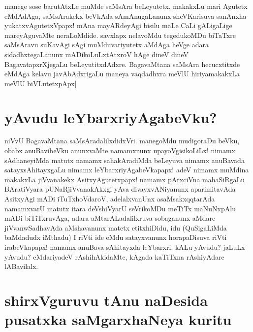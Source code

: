 manege sose barutAtxLe muMde saMsAra beLeyutetx, makakxLu mari Agutetx eMdAdAga, saMsArakekx beVkAda sAmAnugaLanunx sheVKarisuva sanAnxha yukatxvAgutetxVpapx! mAna mayARdeyAgi bisilu maLe CaLi gALigaLige mareyAguvaMte neraLoMdide. savxlapx nelavoMdu tegedukoMDu biTaTxre saMsAravu suKavAgi sAgi muMduvariyutetx aMdAga heVge adara sidadhxtegaLanunx mADikoLuLxtAtxroV hAge dineV dineV BagavatapxrXjegaLu beLeyutitxdAdxre. BagavaMtana saMsAra hecucxtitxde eMdAga kelavu javAbAdxrigaLu maneya vaqdadhxra meVlU hiriyamakakxLa meVlU biVLutetxpApx|

\section*{yAvudu leYbarxriyAgabeVku?}

niVvU BagavaMtana saMsAradalilxdidxVri. manegoMdu mudigoraDu beVku, obabx anuBavibeVku anunxvaMte namamxnunx upayoVgisikoLiLx! nimamx sAdhaneyiMda matutx namamx sahakAradiMda beLeyuva nimamx anuBavada satayxsAhitayxgaLu nimamx leYbarxriyAgabeVkapapx! adeV nimamx muMdina makakxLa jiVvanakekx AsitxyAgutetxpapx! namamx pArxciVna mahaSiRgaLu BAratiVyara pUNaRjiVvanakAkxgi yAva divayxvANiyanunx aparimitavAda AsitxyAgi mADi iTuTxhoVdaroV, adelalxvanUnx asaMsakxqqtarAda namamxvarU matutx itara deVshiVyarU seVrikoMDu meTiTx maNuNxpAlu mADi biTiTxruvAga, adara aMtarALadalilxruva sobaganunx aMdare jiVvanwSadhavAda aMshavanunx matetx etitxhiDidu, idu (QuSigaLiMda baMdadudx iMthadu) I riVti ide eMdu satayxvanunx horapaDisuva riVti irabeVkapapx! namamx anuBava sAhitayxda leYbarxri. kALu yAvudu? jaLuLx yAvudu? eMdariyadeV rAshihAkidaMte, kAgada kaTiTxna rAshiyAdare lABavilalx.

\section*{shirxVguruvu tAnu naDesida pusatxka saMgarxhaNeya kuritu}

